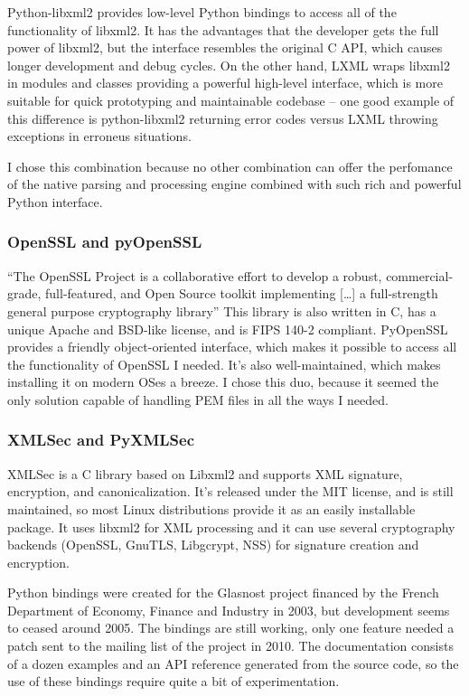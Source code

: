 \label{lxml}
Python-libxml2 provides low-level Python bindings to access all of the functionality of libxml2. It has the advantages that the developer gets the full power of libxml2, but the interface resembles the original C API, which causes longer development and debug cycles. On the other hand, LXML\cite{lxml-homepage} wraps libxml2 in modules and classes providing a powerful high-level interface, which is more suitable for quick prototyping and maintainable codebase -- one good example of this difference is python-libxml2 returning error codes versus LXML throwing exceptions in erroneus situations.

I chose this combination because no other combination can offer the perfomance of the native parsing and processing engine combined with such rich and powerful Python interface.

\subsubsection{OpenSSL and pyOpenSSL}

``The OpenSSL Project is a collaborative effort to develop a robust, commercial-grade, full-featured, and Open Source toolkit implementing [\ldots] a full-strength general purpose cryptography library''\cite{openssl-homepage} This library is also written in C, has a unique Apache and BSD-like license, and is FIPS 140-2 compliant. PyOpenSSL provides a friendly object-oriented interface, which makes it possible to access all the functionality of OpenSSL I needed. It's also well-maintained, which makes installing it on modern OSes a breeze. I chose this duo, because it seemed the only solution capable of handling PEM files in all the ways I needed.

\subsubsection{XMLSec and PyXMLSec}

XMLSec is a C library based on Libxml2 and supports XML signature, encryption, and canonicalization.\cite{xmlsec-homepage} It's released under the MIT license, and is still maintained, so most Linux distributions provide it as an easily installable package. It uses libxml2 for XML processing and it can use several cryptography backends (OpenSSL, GnuTLS, Libgcrypt, NSS) for signature creation and encryption.

Python bindings were created for the Glasnost project financed by the French Department of Economy, Finance and Industry in 2003, but development seems to ceased around 2005. The bindings are still working, only one feature needed a patch sent to the mailing list of the project in 2010. The documentation consists of a dozen examples and an API reference generated from the source code, so the use of these bindings require quite a bit of experimentation.

